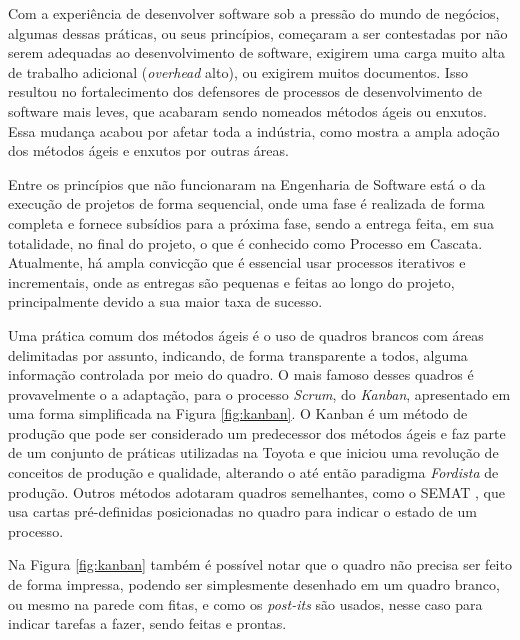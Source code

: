 \documentclass{article}
\begin{document}
Com a experiência de desenvolver software sob a pressão do mundo de negócios, algumas dessas práticas, ou seus princípios,  começaram a ser contestadas por não serem adequadas ao desenvolvimento de software, exigirem uma carga muito alta de trabalho adicional (\textit{overhead} alto), ou exigirem muitos documentos. Isso resultou no fortalecimento dos defensores de processos de desenvolvimento de software mais leves, que acabaram sendo nomeados métodos ágeis ou enxutos. Essa mudança acabou por afetar toda a indústria, como mostra a ampla adoção dos métodos ágeis e enxutos por outras áreas. 

Entre os princípios que não funcionaram na Engenharia de Software está o da execução de projetos de forma sequencial, onde uma fase é realizada de forma completa e fornece subsídios para a próxima fase, sendo a entrega feita, em sua totalidade, no final do projeto, o que é conhecido como Processo em Cascata. Atualmente, há ampla convicção que é essencial usar processos iterativos e incrementais, onde as entregas são pequenas e feitas ao longo do projeto, principalmente devido a sua maior taxa de sucesso\citep{pressman:2019,chaos:2015}.

Uma prática comum dos métodos ágeis é o uso de quadros brancos com áreas delimitadas por assunto, indicando, de forma transparente a todos, alguma informação controlada  por meio do quadro. O mais famoso desses quadros é provavelmente o a adaptação, para o processo \textit{Scrum}\citep{scrum:sbok:guide}, do \textit{Kanban}, apresentado em uma forma simplificada na Figura \ref{fig:kanban}. O Kanban é um método de produção que pode ser considerado um predecessor dos métodos ágeis e faz  parte de um conjunto de práticas utilizadas na Toyota e que iniciou uma revolução de conceitos de produção e qualidade, alterando o até então paradigma \textit{Fordista} de produção\citep{gross:2003:kanban}. Outros métodos adotaram quadros semelhantes, como o SEMAT \citep{jacobson_essentials_2019}, que usa cartas pré-definidas posicionadas no quadro para indicar o estado de um processo. 

Na Figura \ref{fig:kanban} também é possível notar que o quadro não precisa ser feito de forma impressa, podendo ser simplesmente desenhado em um quadro branco, ou mesmo na parede com fitas, e como os \textit{post-its} são usados, nesse caso para indicar tarefas a fazer, sendo feitas e prontas.
\end{document}
